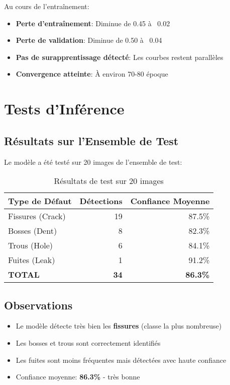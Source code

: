 \documentclass[a4paper,12pt]{report}
\begin{document}
Au cours de l'entraînement:

\begin{itemize}
    \item \textbf{Perte d'entraînement}: Diminue de 0.45 à ~0.02
    \item \textbf{Perte de validation}: Diminue de 0.50 à ~0.04
    \item \textbf{Pas de surapprentissage détecté}: Les courbes restent parallèles
    \item \textbf{Convergence atteinte}: À environ 70-80 époque
\end{itemize}

\section{Tests d'Inférence}

\subsection{Résultats sur l'Ensemble de Test}

Le modèle a été testé sur 20 images de l'ensemble de test:

\begin{table}[H]
    \centering
    \begin{tabular}{|l|r|r|}
    \hline
    \textbf{Type de Défaut} & \textbf{Détections} & \textbf{Confiance Moyenne} \\
    \hline
    Fissures (Crack) & 19 & 87.5\% \\
    \hline
    Bosses (Dent) & 8 & 82.3\% \\
    \hline
    Trous (Hole) & 6 & 84.1\% \\
    \hline
    Fuites (Leak) & 1 & 91.2\% \\
    \hline
    \textbf{TOTAL} & \textbf{34} & \textbf{86.3\%} \\
    \hline
    \end{tabular}
    \caption{Résultats de test sur 20 images}
\end{table}

\subsection{Observations}

\begin{itemize}
    \item Le modèle détecte très bien les \textbf{fissures} (classe la plus nombreuse)
    \item Les bosses et trous sont correctement identifiés
    \item Les fuites sont moins fréquentes mais détectées avec haute confiance
    \item Confiance moyenne: \textbf{86.3\%} - très bonne
\end{itemize}
\end{document}
